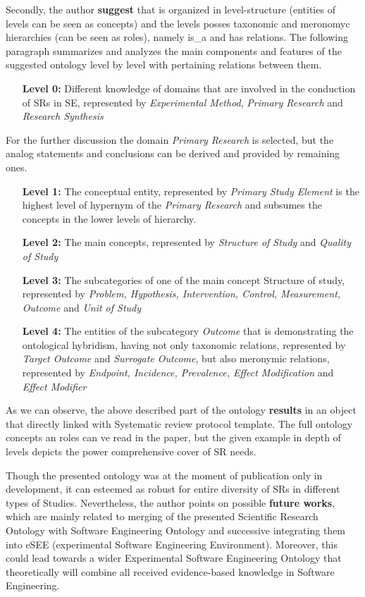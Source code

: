 	Secondly, the author \textbf{suggest} \frqq that is organized in level-structure (entities of levels can be seen as concepts) and the levels posses taxonomic and meronomyc hierarchies (can be seen as roles), namely is\_a and has relations. The following paragraph summarizes and analyzes the main components and features of the suggested ontology level by level with pertaining relations between them.
		\begin{itemize}
			\item[\textbf{Level 0:}]  Different knowledge of domains that are involved in the conduction of SRs in SE, represented by \textit{Experimental Method}, \textit{Primary Research} and \textit{Research Synthesis} 
		\end{itemize}
	For the further discussion the domain \textit{Primary Research} is selected, but the analog statements and conclusions can be derived and provided by remaining ones.
		\begin{itemize}
			\item[\textbf{Level 1:}] The conceptual entity, represented by \textit{Primary Study Element} is the highest level of hypernym of the \textit{Primary Research} and subsumes the concepts in the lower levels of hierarchy.
			\item[\textbf{Level 2:}] The main concepts, represented by \textit{Structure of Study} and \textit{Quality of Study} 
			\item[\textbf{Level 3:}] The subcategories of one of the main concept Structure of study, represented by \textit{Problem, Hypothesis, Intervention, Control, Measurement, Outcome} and \textit{Unit of Study}
			\item[\textbf{Level 4:}] The entities of the subcategory \textit{Outcome} that is demonstrating the ontological hybridism, having not only taxonomic relations, represented by \textit{Target Outcome} and \textit{Surrogate Outcome}, but also meronymic relations, represented by \textit{Endpoint, Incidence, Prevalence, Effect Modification} and \textit{Effect Modifier} 
		\end{itemize}
	  As we can observe, the above described part of the ontology \textbf{results} in an object that directly linked with Systematic review protocol template. The full ontology concepts an roles can ve read in the paper, but the given example in depth of levels depicts the power comprehensive cover of SR needs. \newline
	  
	  Though the presented ontology was at the moment of publication only in development, it can esteemed as robust for entire diversity of SRs in different types of Studies. Nevertheless, the  author points on possible \textbf{future works}, which are mainly related to merging of the presented Scientific Research Ontology with Software Engineering Ontology and successive integrating them into eSEE (experimental Software Engineering Environment). Moreover, this could lead towards a wider Experimental Software Engineering Ontology that theoretically will combine all received evidence-based knowledge in Software Engineering.  
	 
